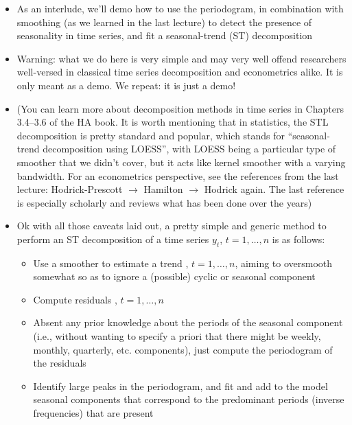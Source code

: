 \documentclass{article}
\begin{document}
\begin{itemize}
\item As an interlude, we'll demo how to use the periodogram, in combination
  with smoothing (as we learned in the last lecture) to detect the presence of 
  seasonality in time series, and fit a seasonal-trend (ST) decomposition 

\item Warning: what we do here is very simple and may very well offend
  researchers well-versed in classical time series decomposition and
  econometrics alike. It is only meant as a demo. We repeat: it is just a demo! 

\item (You can learn more about decomposition methods in time series in Chapters 
  3.4--3.6 of the HA book. It is worth mentioning that in statistics, the STL
  decomposition is pretty standard and popular, which stands for
  ``seasonal-trend decomposition using LOESS'', with LOESS being a particular
  type of smoother that we didn't cover, but it acts like kernel smoother with a
  varying bandwidth. For an econometrics perspective, see the references from
  the last lecture: Hodrick-Prescott $\to$ Hamilton $\to$ Hodrick again. The
  last reference is especially scholarly and reviews what has been done over the
  years)

\item Ok with all those caveats laid out, a pretty simple and generic method to
  perform an ST decomposition of a time series $y_t$, $t = 1,\dots,n$ is as
  follows:    
  \begin{itemize}
  \item Use a smoother to estimate a trend , $t = 1,\dots,n$,
    aiming to oversmooth somewhat so as to ignore a (possible) cyclic or
    seasonal component  

  \item Compute residuals , $t = 1,\dots,n$

  \item Absent any prior knowledge about the periods of the seasonal component 
    (i.e., without wanting to specify a priori that there might be weekly,
    monthly, quarterly, etc. components), just compute the periodogram of the
    residuals

\item Identify large peaks in the periodogram, and fit and add to the model
  seasonal components that correspond to the predominant periods (inverse 
  frequencies) that are present  
  \end{itemize}


\end{itemize}
\end{document}
